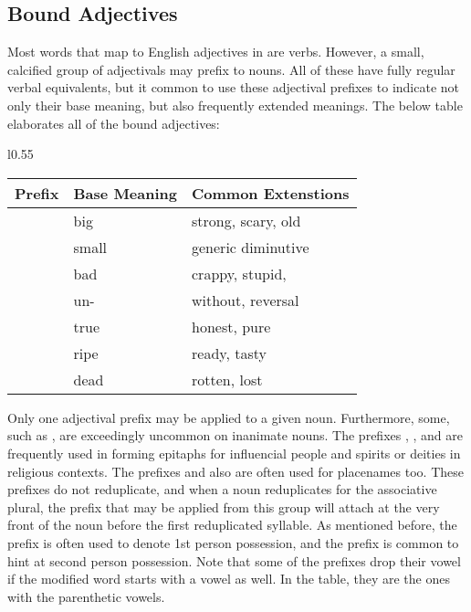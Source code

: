   \subsection{Bound Adjectives}
  Most words that map to English adjectives in \langname are verbs. However, a small, calcified group of adjectivals may prefix to nouns. All of these have fully regular verbal equivalents, but it common to use these adjectival prefixes to indicate not only their base meaning, but also frequently extended meanings. The below table elaborates all of the bound adjectives:
  \vertspace
  \begin{wrapfigure}{l}{0.55\textwidth}
    \begin{tabular}{|l|l|l|}
      \hline
      Prefix                   & Base Meaning & Common Extenstions   \\ \hline \hline
      \prefixtext{\boundbig}   & big          & strong, scary, old   \\
      \prefixtext{\boundsmall} & small        & generic diminutive  \\
      \prefixtext{\boundbad}   & bad          & crappy, stupid,    \\
      \prefixtext{\boundneg}   & un-          & without, reversal    \\
      \prefixtext{\boundtrue}  & true         & honest, pure         \\
      \prefixtext{\boundripe}  & ripe         & ready, tasty         \\
      \prefixtext{\bounddead}  & dead         & rotten, lost         \\ \hline
    \end{tabular}
  \end{wrapfigure}
  Only one adjectival prefix may be applied to a given noun. Furthermore, some, such as \prefixtext{\bounddead}, are exceedingly uncommon on inanimate nouns. The prefixes \prefixtext{\boundbig}, \prefixtext{\boundsmall}, and \prefixtext{\boundtrue} are frequently used in forming epitaphs for influencial people and spirits or deities in religious contexts. The prefixes \prefixtext{\boundripe} and \prefixtext{\boundbig} also are often used for placenames too. These prefixes do not reduplicate, and when a noun reduplicates for the associative plural, the prefix that may be applied from this group will attach at the very front of the noun before the first reduplicated syllable. As mentioned before, the \prefixtext{\boundbad} prefix is often used to denote 1st person possession, and the \prefixtext{\boundtrue} prefix is common to hint at second person possession. Note that some of the prefixes drop their vowel if the modified word starts with a vowel as well. In the table, they are the ones with the parenthetic vowels.
  \vertspace

